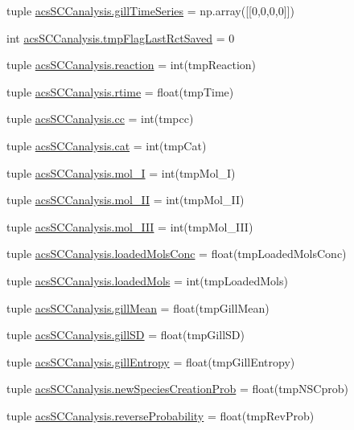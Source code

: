 \begin{DoxyCompactItemize}
\item 
tuple \hyperlink{a00130_a99669fe823cebc560b46c3746f9183e7}{acs\+S\+C\+Canalysis.\+gill\+Time\+Series} = np.\+array(\mbox{[}\mbox{[}0,0,0,0\mbox{]}\mbox{]})
\item 
int \hyperlink{a00130_a6e8aff976901d1424dd1ff00c3387014}{acs\+S\+C\+Canalysis.\+tmp\+Flag\+Last\+Rct\+Saved} = 0
\item 
tuple \hyperlink{a00130_a58c3618ec28f27dfbf09e0d3aba05bc7}{acs\+S\+C\+Canalysis.\+reaction} = int(tmp\+Reaction)
\item 
tuple \hyperlink{a00130_a162a08b0497058c76e7e885c03a01336}{acs\+S\+C\+Canalysis.\+rtime} = float(tmp\+Time)
\item 
tuple \hyperlink{a00130_a67fcb77a15f51e94c98bb48b05865715}{acs\+S\+C\+Canalysis.\+cc} = int(tmpcc)
\item 
tuple \hyperlink{a00130_aea872e34fe0da6302f6195f1b2315148}{acs\+S\+C\+Canalysis.\+cat} = int(tmp\+Cat)
\item 
tuple \hyperlink{a00130_ae13d6607ffa236891a9af05bfa88cfcc}{acs\+S\+C\+Canalysis.\+mol\+\_\+\+I} = int(tmp\+Mol\+\_\+\+I)
\item 
tuple \hyperlink{a00130_a8f2878f5909e4aeb9155a1103eaba413}{acs\+S\+C\+Canalysis.\+mol\+\_\+\+I\+I} = int(tmp\+Mol\+\_\+\+I\+I)
\item 
tuple \hyperlink{a00130_a20047e8516f386a7e98ffa0efec09471}{acs\+S\+C\+Canalysis.\+mol\+\_\+\+I\+I\+I} = int(tmp\+Mol\+\_\+\+I\+I\+I)
\item 
tuple \hyperlink{a00130_abe83f5e0ae3bd65da15a697a979aeea1}{acs\+S\+C\+Canalysis.\+loaded\+Mols\+Conc} = float(tmp\+Loaded\+Mols\+Conc)
\item 
tuple \hyperlink{a00130_ab4566d46d368eb4f93ff6db5191648bd}{acs\+S\+C\+Canalysis.\+loaded\+Mols} = int(tmp\+Loaded\+Mols)
\item 
tuple \hyperlink{a00130_a4e862896701636d17752f14810ff687f}{acs\+S\+C\+Canalysis.\+gill\+Mean} = float(tmp\+Gill\+Mean)
\item 
tuple \hyperlink{a00130_acdb3e72aea08c29494799fd08763b406}{acs\+S\+C\+Canalysis.\+gill\+S\+D} = float(tmp\+Gill\+S\+D)
\item 
tuple \hyperlink{a00130_a4c214eb4f6812d6182bae32715bce3ad}{acs\+S\+C\+Canalysis.\+gill\+Entropy} = float(tmp\+Gill\+Entropy)
\item 
tuple \hyperlink{a00130_a47b24df6e487f6dd90158dde93cc7c93}{acs\+S\+C\+Canalysis.\+new\+Species\+Creation\+Prob} = float(tmp\+N\+S\+Cprob)
\item 
tuple \hyperlink{a00130_aa7db2dba66810044f9c5238eccc995b7}{acs\+S\+C\+Canalysis.\+reverse\+Probability} = float(tmp\+Rev\+Prob)

\end{DoxyCompactItemize}
